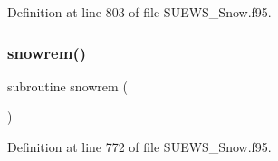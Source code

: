 Definition at line 803 of file S\+U\+E\+W\+S\+\_\+\+Snow.\+f95.

\mbox{\label{_s_u_e_w_s___snow_8f95_ac76e6991de3d894a499934a93dd61744}} 
\subsubsection{\texorpdfstring{snowrem()}{snowrem()}}
{\footnotesize\ttfamily subroutine snowrem (\begin{DoxyParamCaption}{ }\end{DoxyParamCaption})}



Definition at line 772 of file S\+U\+E\+W\+S\+\_\+\+Snow.\+f95.

